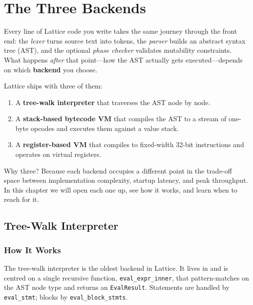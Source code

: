 \chapter{The Three Backends}\label{ch:three-backends}

Every line of Lattice code you write takes the same journey through the front
end: the \emph{lexer} turns source text into tokens, the \emph{parser} builds
an abstract syntax tree (AST), and the optional \emph{phase checker} validates
mutability constraints. What happens \emph{after} that point---how the AST
actually gets executed---depends on which \textbf{backend} you choose.

Lattice ships with three of them:

\begin{enumerate}
  \item A \textbf{tree-walk interpreter} that traverses the AST node by node.
  \item A \textbf{stack-based bytecode VM} that compiles the AST to a stream of
        one-byte opcodes and executes them against a value stack.
  \item A \textbf{register-based VM} that compiles to fixed-width 32-bit
        instructions and operates on virtual registers.
\end{enumerate}

Why three? Because each backend occupies a different point in the trade-off
space between implementation complexity, startup latency, and peak throughput.
In this chapter we will open each one up, see how it works, and learn when to
reach for it.

\section{Tree-Walk Interpreter}\label{sec:tree-walk}

\subsection{How It Works}

The tree-walk interpreter is the oldest backend in Lattice. It lives in
 and is centred on a single recursive function,
\lstinline|eval_expr_inner|, that pattern-matches on the AST node type
and returns an \lstinline|EvalResult|. Statements are handled by
\lstinline|eval_stmt|; blocks by \lstinline|eval_block_stmts|.


